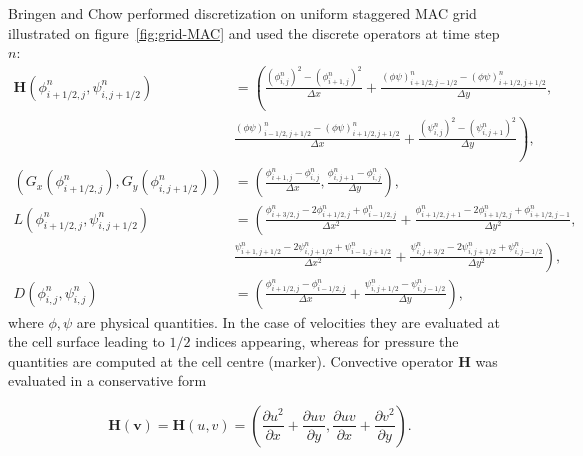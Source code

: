 \documentclass{article}
\begin{document}
	Bringen and Chow \cite{Biringen:2011} performed discretization on  uniform staggered MAC grid illustrated on figure~\ref{fig:grid-MAC} 
	and used the discrete operators at time step $n$:
	\begin{equation}
		\begin{aligned}
			\mathbf{H}(\phi^n_{i+1/2,j},\psi^n_{i,j+1/2})&= \left(   
			\frac{\left(\phi_{i,j}^n\right)^2-\left(\phi_{i+1,j}^n\right)^2}{\Delta x}+
			\frac{(\phi\psi)_{i+1/2,j-1/2}^n-(\phi\psi)_{i+1/2, j+1/2}^n}{\Delta y}		
			\right. ,\\
			& \left. 
			\frac{(\phi \psi)_{i-1/2,j+1/2}^n-(\phi\psi)_{i+1/2,j+1/2}^n}{\Delta x}+
			\frac{\left(\psi_{i,j}^n\right)^2-\left(\psi_{i,j+1}^n\right)^2}{\Delta y} 
			\right),\\
			\left(G_x(\phi^n_{i+1/2,j}),G_y(\phi^n_{i,j+1/2})\right)&= \left(
				\frac{\phi^n_{i+1,j}-\phi^n_{i,j}}{\Delta x},		
				\frac{\phi^n_{i,j+1}-\phi^n_{i,j}}{\Delta y}
			\right),\\
			L(\phi^n_{i+1/2,j},\psi^n_{i,j+1/2})&=\left( 
				\frac{\phi_{i+3/2,j}^n-2 \phi_{i+1/2,j}^n+\phi_{i-1/2,j}^n}{\Delta x^2}+
				\frac{\phi_{i+1/2,j+1}^n-2 \phi_{i+1/2,j}^n+\phi_{i+1/2,j-1}^n}{\Delta y^2}
			\right. , \\
			&\left. 
				\frac{\psi_{i+1,j+1/2}^n-2\psi_{i,j+1/2}^n+\psi_{i-1,j+1/2}^n}{\Delta x^2} 	+
				\frac{\psi_{i,j+3/2}^n-2\psi_{i,j+1/2}^n+\psi_{i,j-1/2}^n}{\Delta y^2} 
			\right),\\
			D(\phi^n_{i,j},\psi^n_{i,j})&=\left(
				\frac{\phi^n_{i+1/2,j}-\phi^n_{i-1/2,j}}{\Delta x}+		
				\frac{\psi^n_{i,j+1/2}-\psi^n_{i,j-1/2}}{\Delta y}
			\right),
		\end{aligned}
	\end{equation}
	where $\phi,\psi$ are physical quantities. In the case of velocities they are evaluated at the cell surface leading to $1/2$ indices appearing, whereas for pressure the quantities are computed at the cell centre (marker). Convective operator $\mathbf{H}$ was evaluated in a conservative form 
	
	\begin{equation}
		\mathbf{H}(\boldsymbol{v})=\mathbf{H}(u,v)=\left(\frac{\partial u^2}{\partial x}+\frac{\partial u v}{\partial y},\frac{\partial u v}{\partial x}+\frac{\partial v^2}{\partial y}\right).
	\end{equation}
	
	
\end{document}
